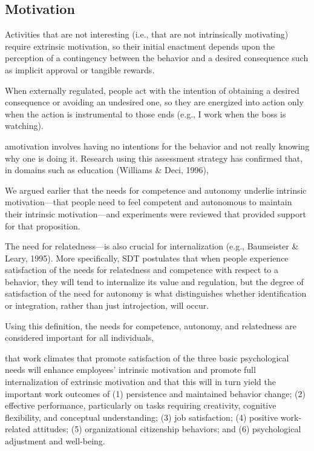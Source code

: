 \subsection{Motivation}
Activities that are not interesting (i.e., that are not intrinsically motivating) require extrinsic motivation, so their initial enactment depends upon the perception of a contingency between the behavior and a desired consequence such as implicit approval or tangible rewards.

When externally regulated, people act with the intention of obtaining a desired consequence or avoiding an undesired one, so they are energized into action only when the action is instrumental to those ends (e.g., I work when the boss is watching).

amotivation involves having no intentions for the behavior and not really knowing why one is doing it. Research using this assessment strategy has conﬁrmed that, in domains such as education (Williams \& Deci, 1996),

We argued earlier that the needs for competence and autonomy underlie intrinsic motivation—that people need to feel competent and autonomous to maintain their intrinsic motivation—and experiments were reviewed that provided support for that proposition.

The need for relatedness—is also crucial for internalization (e.g., Baumeister \& Leary, 1995). More speciﬁcally, SDT postulates that when people experience satisfaction of the needs for relatedness and competence with respect to a behavior, they will tend to internalize its value and regulation, but the degree of satisfaction of the need for autonomy is what distinguishes whether identiﬁcation or integration, rather than just introjection, will occur.

Using this deﬁnition, the needs for competence, autonomy, and relatedness are considered important for all individuals,

that work climates that promote satisfaction of the three basic psychological needs will enhance employees’ intrinsic motivation and promote full internalization of extrinsic motivation and that this will in turn yield the important work outcomes of (1) persistence and maintained behavior change; (2) effective performance, particularly on tasks requiring creativity, cognitive ﬂexibility, and conceptual understanding; (3) job satisfaction; (4) positive work-related attitudes; (5) organizational citizenship behaviors; and (6) psychological adjustment and well-being.


